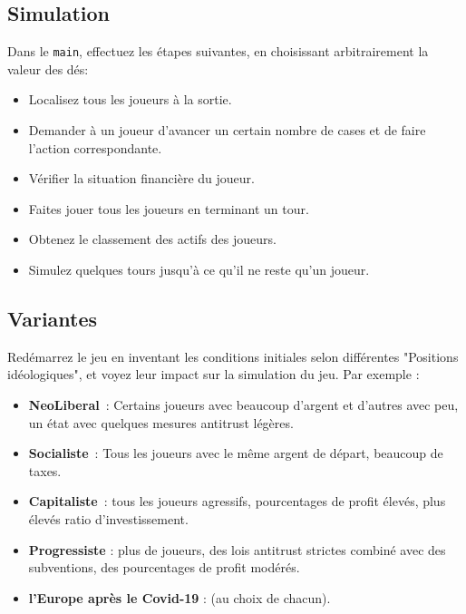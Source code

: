 \documentclass[12pt]{article}
\begin{document}
\subsection{Simulation}
 Dans le \texttt{main}, effectuez les étapes suivantes, en choisissant arbitrairement la valeur des dés:
 \begin{itemize}
\item   Localisez tous les joueurs à la sortie.
\item    Demander à un joueur d'avancer un certain nombre de cases et de faire l'action correspondante.
\item    Vérifier la situation financière du joueur.
\item    Faites jouer tous les joueurs en terminant un tour.
\item    Obtenez le classement des actifs des joueurs.
\item Simulez quelques tours jusqu'à ce qu'il ne reste qu'un joueur.
\end{itemize}


\subsection{Variantes} 
Redémarrez le jeu en inventant les conditions initiales selon différentes
"Positions idéologiques", et voyez leur impact sur la simulation du jeu. Par
exemple :
\begin{itemize}
  \item \textbf{NeoLiberal}~: Certains joueurs avec beaucoup d'argent et d'autres avec peu, un état avec quelques
mesures antitrust légères.
  \item \textbf{Socialiste}~: Tous les joueurs avec le même argent de départ, beaucoup de taxes.
  \item \textbf{Capitaliste}~: tous les joueurs agressifs, pourcentages de profit élevés, plus élevés
ratio d'investissement.
  \item \textbf{Progressiste} : plus de joueurs, des lois antitrust strictes
combiné avec des subventions, des pourcentages de profit modérés.
  \item \textbf{l'Europe après le Covid-19} : (au choix de chacun).
\end{itemize}
\end{document}

